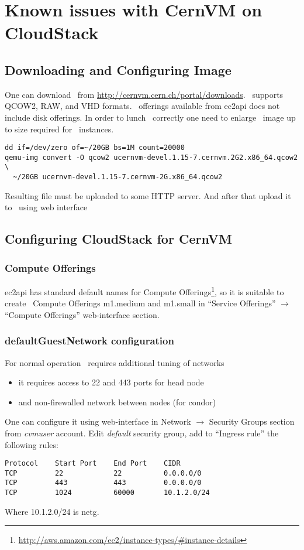 \chapter{Known issues with CernVM on CloudStack}
\label{cpt:issues}

\section{Downloading and Configuring Image}
One can download \cernvm\ from \url{http://cernvm.cern.ch/portal/downloads}.
\cstack\ supports QCOW2, RAW, and VHD formats. 
\cstack\ offerings available from \acrshort{ec2api} does not include disk offerings. 
In order to lunch \cernvm\ correctly one need to enlarge \cernvm\ image up to size required for \cernvm\ instances.

\begin{lstlisting}[deletekeywords={if}]
dd if=/dev/zero of=~/20GB bs=1M count=20000
qemu-img convert -O qcow2 ucernvm-devel.1.15-7.cernvm.2G2.x86_64.qcow2 \
  ~/20GB ucernvm-devel.1.15-7.cernvm-2G.x86_64.qcow2
\end{lstlisting}
Resulting file must be uploaded to some HTTP server.
And after that upload it to \cstack\ using web interface


\section{Configuring CloudStack for CernVM}

\subsection{Compute Offerings}
\acrshort{ec2api} has standard default names for Compute Offerings\footnote{\url{http://aws.amazon.com/ec2/instance-types/\#instance-details}}, so it is suitable to create \cstack\ Compute Offerings m1.medium and m1.small in ``Service Offerings'' $\rightarrow$ ``Compute Offerings'' web-interface section.

\subsection{defaultGuestNetwork configuration}
For normal operation \cernvm\ requires additional tuning of networks
\begin{itemize}
	\item it requires access to 22 and 443 ports for head node
	\item and non-firewalled network between nodes (for condor)
\end{itemize}
One can configure it using web-interface in Network $\rightarrow$ Security Groups section from \emph{cvmuser} account.
Edit \emph{default} security group, add to ``Ingress rule''  the following rules:
\begin{lstlisting}
Protocol    Start Port    End Port    CIDR
TCP         22            22          0.0.0.0/0
TCP         443           443         0.0.0.0/0
TCP         1024          60000       10.1.2.0/24
\end{lstlisting}
Where 10.1.2.0/24 is \acrshort{netg}. 


